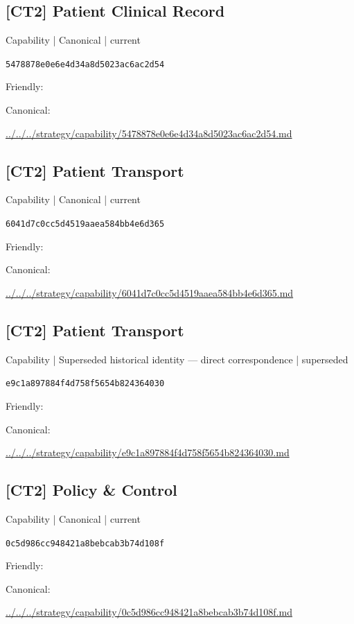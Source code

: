 \documentclass[10pt,a4paper]{article}
\begin{document}
\subsection*{[CT2] Patient Clinical Record}
{\small Capability | Canonical | current}\par
\texttt{5478878e0e6e4d34a8d5023ac6ac2d54}\par
Friendly: \par
Canonical: \par
{\footnotesize\url{../../../strategy/capability/5478878e0e6e4d34a8d5023ac6ac2d54.md}}\par
\subsection*{[CT2] Patient Transport}
{\small Capability | Canonical | current}\par
\texttt{6041d7c0cc5d4519aaea584bb4e6d365}\par
Friendly: \par
Canonical: \par
{\footnotesize\url{../../../strategy/capability/6041d7c0cc5d4519aaea584bb4e6d365.md}}\par
\subsection*{[CT2] Patient Transport}
{\small Capability | Superseded historical identity — direct correspondence | superseded}\par
\texttt{e9c1a897884f4d758f5654b824364030}\par
Friendly: \par
Canonical: \par
{\footnotesize\url{../../../strategy/capability/e9c1a897884f4d758f5654b824364030.md}}\par
\subsection*{[CT2] Policy \& Control}
{\small Capability | Canonical | current}\par
\texttt{0c5d986cc948421a8bebcab3b74d108f}\par
Friendly: \par
Canonical: \par
{\footnotesize\url{../../../strategy/capability/0c5d986cc948421a8bebcab3b74d108f.md}}\par
\end{document}
